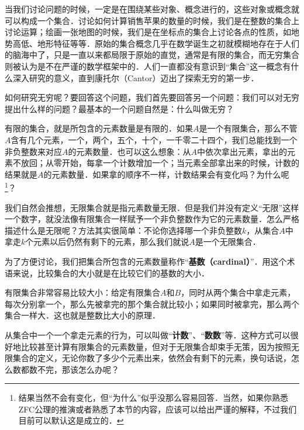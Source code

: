 
当我们讨论问题的时候，一定是在围绕某些对象、概念进行的，这些对象或概念就可以构成一个集合．讨论如何计算销售苹果的数量的时候，我们是在整数的集合上讨论运算；绘画一张地图的时候，我们是在坐标点的集合上讨论各点的性质，如地势高低、地形特征等等．原始的集合概念几乎在数学诞生之初就模糊地存在于人们的脑海中了，只是一直以来都局限于原始的直觉，通常是有限的集合，而无穷集合则被认为是不在严谨的数学框架中的．人们一直都没有意识到“集合”这一概念有什么深入研究的意义，直到康托尔（Cantor）迈出了探索无穷的第一步．

如何研究无穷呢？要回答这个问题，我们首先要回答另一个问题：我们可以对无穷提出什么样的问题？最基本的一个问题自然是：什么叫做无穷？

有限的集合，就是所包含的元素数量是有限的．如果$A$是一个有限集合，那么不管$A$含有几个元素，一个，两个，五个，十个，一千零二十四个，我们总能找到一个非负整数来对应$A$的元素数量．也可以这么想象：从$A$中依次拿出元素，拿出的元素不放回；从零开始，每拿一个计数增加一个；当元素全部拿出来的时候，计数的结果就是$A$的元素数量．如果拿的顺序不一样，计数结果会有变化吗？为什么呢\footnote{结果当然不会有变化，但“为什么”似乎没那么容易回答．当然，如果你熟悉ZFC公理的推演或者熟悉了本节的内容，应该可以给出严谨的解释，不过我们目前可以默认这是成立的．}？

我们自然会推想，无限集合就是指元素数量无限．但是我们并没有定义“无限”这样一个数字，就没法像有限集合一样赋予一个非负整数作为它的元素数量．怎么严格描述什么是无限呢？方法其实很简单：不论你选择哪一个非负整数$k$，从集合$A$中拿走$k$个元素以后仍然有剩下的元素，那么我们就说$A$是一个无限集合．

为了方便讨论，我们把集合所包含的元素数量称作“\textbf{基数（cardinal）}”．用这个术语来说，比较集合的大小就是在比较它们的基数的大小．

有限集合非常容易比较大小：给定有限集合$A$和$B$，同时从两个集合中拿走元素，每次分别拿一个，那么先被拿完的那个集合就比较小；如果同时被拿完，那么两个集合一样大．这也就是整数比大小的原理．

从集合中一个一个拿走元素的行为，可以叫做“\textbf{计数}”、“\textbf{数数}”等．这种方式可以很好地比较甚至计算有限集合的元素数量，但对于无限集合却束手无策，因为按照无限集合的定义，无论你数了多少个元素出来，依然会有剩下的元素，换句话说，怎么数都数不完，那该怎么办呢？

